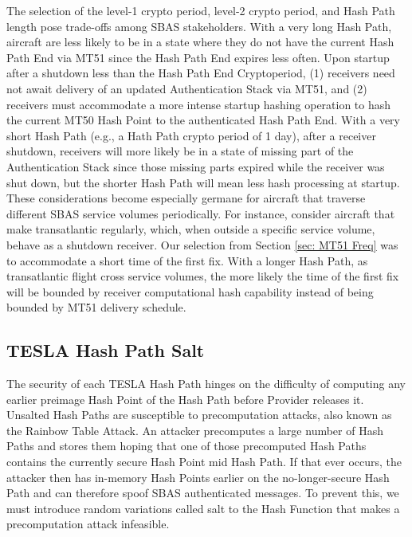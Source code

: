 \documentclass[letterpaper,times]{IONconf/IONconf}
\begin{document}
The selection of the level-1 crypto period, level-2 crypto period, and Hash Path length pose trade-offs among SBAS stakeholders.
With a very long Hash Path, aircraft are less likely to be in a state where they do not have the current Hash Path End via MT51 since the Hash Path End expires less often.
Upon startup after a shutdown less than the Hash Path End Cryptoperiod, (1) receivers need not await delivery of an updated Authentication Stack via MT51, and (2) receivers must accommodate a more intense startup hashing operation to hash the current MT50 Hash Point to the authenticated Hash Path End.
With a very short Hash Path (e.g., a Hath Path crypto period of 1 day), after a receiver shutdown, receivers will more likely be in a state of missing part of the Authentication Stack since those missing parts expired while the receiver was shut down, but the shorter Hash Path will mean less hash processing at startup.
These considerations become especially germane for aircraft that traverse different SBAS service volumes periodically.
For instance, consider aircraft that make transatlantic regularly, which, when outside a specific service volume, behave as a shutdown receiver.
Our selection from Section \ref{sec: MT51 Freq} was to accommodate a short time of the first fix.
With a longer Hash Path, as transatlantic flight cross service volumes, the more likely the time of the first fix will be bounded by receiver computational hash capability instead of being bounded by MT51 delivery schedule. 

\subsection{TESLA Hash Path Salt} \label{sec: salt}

The security of each TESLA Hash Path hinges on the difficulty of computing any earlier preimage Hash Point of the Hash Path before Provider releases it.
Unsalted Hash Paths are susceptible to precomputation attacks, also known as the Rainbow Table Attack.
An attacker precomputes a large number of Hash Paths and stores them hoping that one of those precomputed Hash Paths contains the currently secure Hash Point mid Hash Path.
If that ever occurs, the attacker then has in-memory Hash Points earlier on the no-longer-secure Hash Path and can therefore spoof SBAS authenticated messages.
To prevent this, we must introduce random variations called salt to the Hash Function that makes a precomputation attack infeasible.
\end{document}
